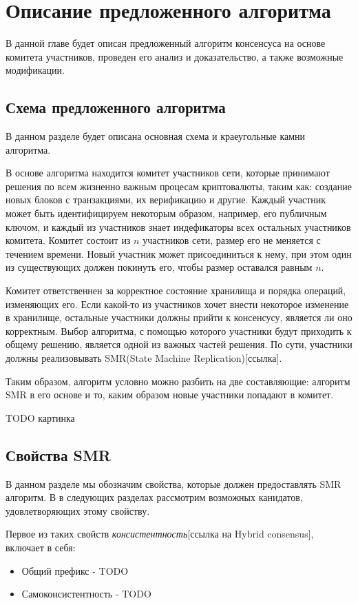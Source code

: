 
\chapter{Описание предложенного алгоритма}
В данной главе будет описан предложенный алгоритм консенсуса на основе комитета участников, проведен его анализ и доказательство,
а также возможные модификации.

\section{Схема предложенного алгоритма}
В данном разделе будет описана основная схема и краеугольные камни алгоритма.

В основе алгоритма находится комитет участников сети, 
которые принимают решения по всем жизненно важным процесам криптовалюты, таким как: создание новых блоков с транзакциями, их верификацию и другие. 
Каждый участник может быть идентифицируем некоторым образом, например, его публичным ключом, и каждый из участников
знает индефикаторы всех остальных участников комитета.
Комитет состоит из $n$ участников сети, размер его не меняется с течением времени. 
Новый участник может присоединиться к нему, при этом один из существующих должен покинуть его, чтобы размер оставался равным $n$.

Комитет ответственнен за корректное состояние хранилища и порядка операций, изменяющих его.
Если какой-то из участников хочет внести некоторое изменение в хранилище, остальные участники должны прийти к консенсусу, является ли оно корректным. 
Выбор алгоритма, с помощью которого участники будут приходить к общему решению, является одной из важных частей решения.  
По сути, участники должны реализовывать SMR(State Machine Replication)[ссылка].

Таким образом, алгоритм условно можно разбить на две составляющие: алгоритм SMR в его основе и то, каким образом новые участники попадают в комитет.

TODO картинка

\section{Свойства SMR}
В данном разделе мы обозначим свойства, которые должен предоставлять SMR алгоритм.
В в следующих разделах рассмотрим возможных канидатов, удовлетворяющих этому свойству.

Первое из таких свойств \textit{консистентность}[ссылка на Hybrid consensus], включает в себя:
\begin{itemize}
\item Общий префикс - TODO
\item Самоконсистентность - TODO
\end{itemize}